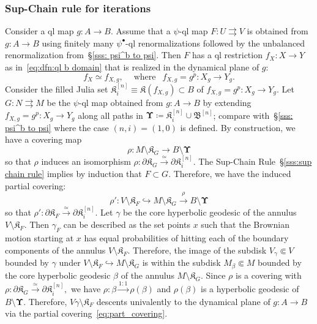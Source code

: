\documentclass{amsart}
\newcommand{\filled}{{\mathfrak K }}
\newcommand{\bbush}{{\boldsymbol {\mathfrak B} }}
\newcommand{\bUpsilon}{{\boldsymbol {\Upsilon} }}
\renewcommand{\sp}{{\ \ }}
\newcommand{\1}{{\mathbb 1 }}
\begin{document}
\subsubsection{Sup-Chain rule for iterations}\label{sss:SupChainRule:iterations} Consider a  ql map $g\colon A\to B$. Assume that a $\psi$-ql map $F\colon U\rightrightarrows V$ is obtained from $g\colon A\to B$ using finitely many $\psi^\bullet$-ql renormalizations followed by the unbalanced renormalization from~\S\ref{sss: psi^b to psi}. Then $F$ has a ql restriction $f_X\colon X\to Y$ as in~\eqref{eq:dfn:ql b domain} that is realized in the dynamical plane of $g$:
\[ f_{X} \simeq f_{X,g}, \sp \sp \text{ where }\sp f_{X,g}=g^p\colon X_g\to Y_g.\] 
Consider the filled Julia set $\filled^{[n]}_i\equiv \filled(f_{X,g})\subset B$ of $f_{X,g}=g^p\colon X_g\to Y_g$. Let $G\colon N\rightrightarrows M$ be the $\psi$-ql map obtained from $g\colon A\to B$ by extending $f_{X,g}=g^p\colon X_g\to Y_g$ along all paths in $\bUpsilon\coloneqq \filled^{[n]}_i\cup \bbush^{[n]}$; compare with~\S\ref{sss: psi^b to psi} where the case $(n,i)=(1,0)$ is defined. By construction, we have a covering map
\[\rho \colon M\setminus \filled_G \to B\setminus \bUpsilon\] so that $\rho$ induces an isomorphism $\rho \colon \partial \filled_G \overset{\simeq }\longrightarrow \partial\filled^{[n]}_i.$ The Sup-Chain Rule~\S\ref{sss:sup chain rule} implies by induction that $F\subset G$. Therefore, we have the induced partial covering:
\begin{equation}
\label{eq:part_covering}
\rho'\colon V\setminus \filled_F \hookrightarrow M\setminus \filled_G\overset{\rho}\longrightarrow B\setminus \bUpsilon
\end{equation}
so that $\rho' \colon \partial \filled_F \overset{\simeq }\longrightarrow \partial\filled^{[n]}_i.$ Let $\gamma$ be the core hyperbolic geodesic of the annulus $V\setminus \filled_F$. Then $\gamma_F$ can be described as the set points $x$ such that the Brownian motion starting at $x$ has equal probabilities of hitting each of the boundary components of the annulus $V\setminus  \filled_F$. Therefore, the image of the subdisk $V_\gamma\Subset V$ bounded by $\gamma$ under $V\setminus \filled_F \hookrightarrow M\setminus \filled_G$ is within the subdisk $M_\beta\Subset M$ bounded by the core hyperbolic geodesic $\beta$ of the annulus $M\setminus \filled_G$. Since $\rho$ is a covering with $\rho \colon \partial \filled_G \overset{\simeq }\longrightarrow \partial\filled^{[n]}_i,$ we have $\rho\colon \beta\overset{1:1}\longrightarrow \rho(\beta)$ and $\rho(\beta)$ is a hyperbolic geodesic of $B\setminus \bUpsilon$. Therefore, $V\gamma\setminus \filled_F$ descents univalently to the dynamical plane of $g\colon A\to B$ via the partial covering~\eqref{eq:part_covering}.
 
\end{document}
